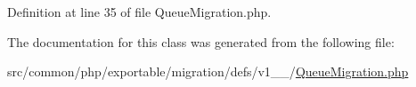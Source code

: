 Definition at line 35 of file Queue\+Migration.\+php.



The documentation for this class was generated from the following file\+:\begin{DoxyCompactItemize}
\item 
src/common/php/exportable/migration/defs/v1\+\_\+\_/\hyperlink{v1__0__0_2QueueMigration_8php}{Queue\+Migration.\+php}\end{DoxyCompactItemize}
